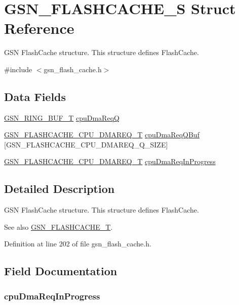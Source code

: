 \hypertarget{a00077}{
\section{GSN\_\-FLASHCACHE\_\-S Struct Reference}
\label{a00077}
}


GSN FlashCache structure. This structure defines FlashCache.  




{\ttfamily \#include $<$gsn\_\-flash\_\-cache.h$>$}

\subsection*{Data Fields}
\begin{DoxyCompactItemize}
\item 
\hyperlink{a00191}{GSN\_\-RING\_\-BUF\_\-T} \hyperlink{a00077_a0cfc6093607695c0f61ece0577903e0e}{cpuDmaReqQ}
\item 
\hyperlink{a00075}{GSN\_\-FLASHCACHE\_\-CPU\_\-DMAREQ\_\-T} \hyperlink{a00077_ac11c28eca3d6ee095cfc57c877110de9}{cpuDmaReqQBuf} \mbox{[}GSN\_\-FLASHCACHE\_\-CPU\_\-DMAREQ\_\-Q\_\-SIZE\mbox{]}
\item 
\hyperlink{a00075}{GSN\_\-FLASHCACHE\_\-CPU\_\-DMAREQ\_\-T} \hyperlink{a00077_acdb12628d1b368aca3d39014c686721e}{cpuDmaReqInProgress}
\end{DoxyCompactItemize}


\subsection{Detailed Description}
GSN FlashCache structure. This structure defines FlashCache. 

\begin{DoxySeeAlso}{See also}
\hyperlink{a00646_gab86e11d61e9a3e75985fb1ef6a081165}{GSN\_\-FLASHCACHE\_\-T}. 
\end{DoxySeeAlso}


Definition at line 202 of file gsn\_\-flash\_\-cache.h.



\subsection{Field Documentation}
\hypertarget{a00077_acdb12628d1b368aca3d39014c686721e}{
\subsubsection[{cpuDmaReqInProgress}]{ {\bf cpuDmaReqInProgress}}}
\label{a00077_acdb12628d1b368aca3d39014c686721e}


